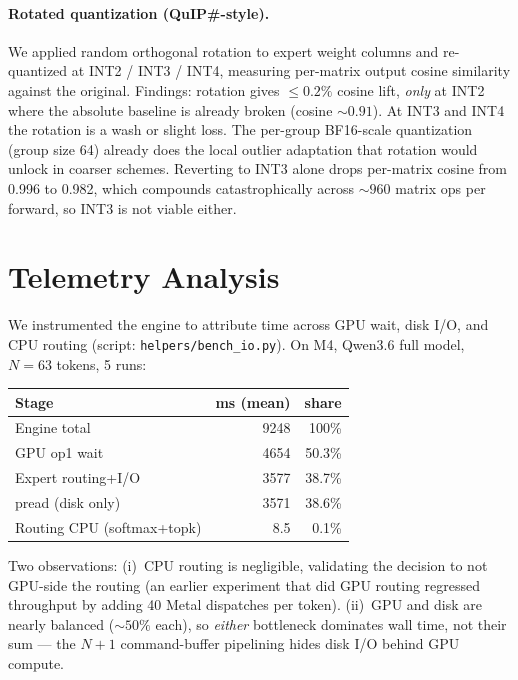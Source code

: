 \documentclass[11pt,a4paper]{article}
\begin{document}
\paragraph{Rotated quantization (QuIP\#-style).} We applied random
orthogonal rotation to expert weight columns and re-quantized at INT2
/ INT3 / INT4, measuring per-matrix output cosine similarity against
the original. Findings: rotation gives $\leq 0.2\%$ cosine lift,
\emph{only} at INT2 where the absolute baseline is already broken
(cosine $\sim 0.91$). At INT3 and INT4 the rotation is a wash or
slight loss. The per-group BF16-scale quantization (group size 64)
already does the local outlier adaptation that rotation would unlock
in coarser schemes. Reverting to INT3 alone drops per-matrix cosine
from 0.996 to 0.982, which compounds catastrophically across $\sim 960$
matrix ops per forward, so INT3 is not viable either.

\section{Telemetry Analysis}\label{sec:telemetry}

We instrumented the engine to attribute time across GPU wait, disk
I/O, and CPU routing (script: \texttt{helpers/bench\_io.py}). On M4,
Qwen3.6 full model, $N{=}63$ tokens, 5 runs:

\begin{center}
\begin{tabular}{lrr}
\toprule
Stage & ms (mean) & share \\
\midrule
Engine total          & 9248 & 100\% \\
\quad GPU op1 wait    & 4654 & 50.3\% \\
\quad Expert routing+I/O & 3577 & 38.7\% \\
\qquad pread (disk only) & 3571 & 38.6\% \\
\quad Routing CPU (softmax+topk) & 8.5 & 0.1\% \\
\bottomrule
\end{tabular}
\end{center}

Two observations: (i)~CPU routing is negligible, validating the
decision to not GPU-side the routing (an earlier experiment that did
GPU routing regressed throughput by adding 40 Metal dispatches per
token). (ii)~GPU and disk are nearly balanced ($\sim 50\%$ each), so
\emph{either} bottleneck dominates wall time, not their sum --- the
$N{+}1$ command-buffer pipelining hides disk I/O behind GPU compute.
\end{document}
